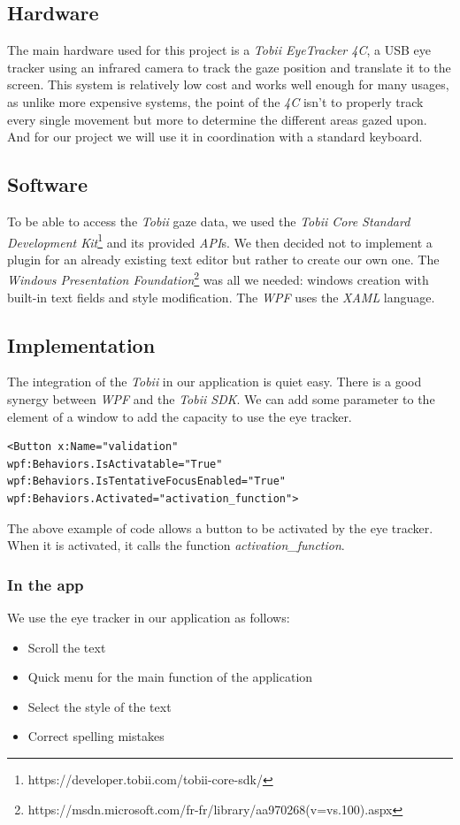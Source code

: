 \documentclass[12pt, a4paper, twoside]{article}
\begin{document}
\subsection{Hardware}
The main hardware used for this project is a \textit{Tobii EyeTracker 4C}, a USB eye tracker using an infrared camera to track the gaze position and translate it to the screen. This system is relatively low cost and works well enough for many usages, as unlike more expensive systems, the point of the \textit{4C} isn't to properly track every single movement but more to determine the different areas gazed upon. 
And for our project we will use it in coordination with a standard keyboard.

\subsection{Software}
To be able to access the \textit{Tobii} gaze data, we used the \textit{Tobii Core Standard Development Kit}\footnote{https://developer.tobii.com/tobii-core-sdk/} and its provided \textit{API}s. We then decided not to implement a plugin for an already existing text editor but rather to create our own one. The \textit{Windows Presentation Foundation}\footnote{https://msdn.microsoft.com/fr-fr/library/aa970268(v=vs.100).aspx} was all we needed: windows creation with built-in text fields and style modification. The \textit{WPF} uses the \textit{XAML} language. 

\subsection{Implementation}
The integration of the \textit{Tobii} in our application is quiet easy. There is a good synergy between \textit{WPF} and the \textit{Tobii SDK}. We can add some parameter to the element of a window to add the capacity to use the eye tracker.

\begin{lstlisting}
<Button x:Name="validation"
wpf:Behaviors.IsActivatable="True"
wpf:Behaviors.IsTentativeFocusEnabled="True"
wpf:Behaviors.Activated="activation_function">
\end{lstlisting}

The above example of code allows a button to be activated by the eye tracker. When it is activated, it calls the function \textit{activation\_function}.

\subsubsection{In the app}
We use the eye tracker in our application as follows:
\begin{itemize}
\item Scroll the text
\item Quick menu for the main function of the application
\item Select the style of the text
\item Correct spelling mistakes
\end{itemize}
\end{document}
